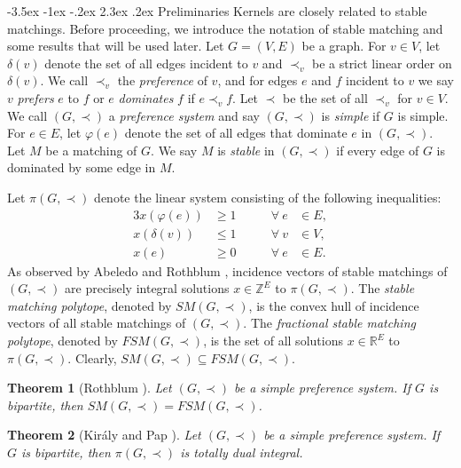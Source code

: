 \documentclass[11pt]{article}
\makeatletter
\newtheorem{theorem}{Theorem}%
\numberwithin{theorem}{section}
\renewcommand\section{%
  \@startsection{section}{1}
                {\z@}%
                {-3.5ex \@plus -1ex \@minus -.2ex}%
                {2.3ex \@plus.2ex}%
                {\large\bfseries}%
}
\makeatother
\begin{document}
\section{Preliminaries}
\label{pre}
Kernels are closely related to stable matchings.
Before proceeding, we introduce the notation of stable matching and some results that will be used later.
Let $G=(V,E)$ be a graph.
For $v\in V$, let $\delta(v)$ denote the set of all edges incident to $v$ and $\prec_v$ be a strict linear order on $\delta(v)$.
We call $\prec_v$ the \emph{preference} of $v$, and for edges $e$ and $f$ incident to $v$ we say $v$ \emph{prefers} $e$ to $f$ or $e$ \emph{dominates} $f$ if $e\prec_v f$. Let $\prec$ be the set of all  $\prec_v$ for $v\in V$.
We call $(G,\prec)$ a \emph{preference system} and say $(G,\prec)$ is \emph{simple} if $G$ is simple.
For $e\in E$, let $\varphi(e)$ denote the set of all edges that dominate $e$ in $(G,\prec)$.
Let $M$ be a matching of $G$. We say $M$ is \emph{stable} in $(G,\prec)$ if every edge of $G$ is dominated by some edge in $M$.

Let $\pi(G,\prec)$ denote the linear system consisting of the following inequalities:
\begin{alignat}{3}
x(\varphi(e)) &\geq 1 &\qquad \forall ~e &\in E,\label{stability constraints}\\
x(\delta(v)) &\leq 1 &\qquad \forall ~v &\in V,\label{matching constraints}\\
x(e) &\geq 0 &\qquad \forall ~e &\in E.\label{edge nonnegativity}
\end{alignat}
As observed by Abeledo and Rothblum \cite{AbelRoth94}, incidence vectors of stable matchings of $(G,\prec)$ are precisely integral solutions $x\in \mathbb{Z}^E$ to $\pi(G,\prec)$.
The \textit{stable matching polytope}, denoted by $SM(G,\prec)$, is the convex hull of incidence vectors of all stable matchings of $(G,\prec)$. The \textit{fractional stable matching polytope}, denoted by $FSM(G,\prec)$, is the set of all solutions $x\in \mathbb{R}^E$ to $\pi(G,\prec)$. Clearly, $SM(G,\prec)\subseteq FSM(G,\prec)$.

\begin{theorem}[Rothblum \cite{Roth92}]
\label{thm:Roth92}
Let $(G,\prec)$ be a simple preference system. If $G$ is bipartite, then
$SM(G,\prec)=FSM(G,\prec)$.
\end{theorem}

\begin{theorem}[Kir\'{a}ly and Pap \cite{KiraPap08}]
\label{thm:KiraPap08}
Let $(G,\prec)$ be a simple preference system. If $G$ is bipartite, then $\pi(G,\prec)$ is totally dual integral.
\end{theorem}
\end{document}

